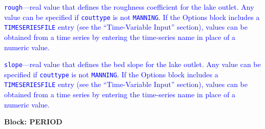 \begin{description}
\item \textcolor{blue}{\texttt{rough}---real value that defines the roughness coefficient for the lake outlet. Any value can be specified if \texttt{couttype} is not \texttt{MANNING}. If the Options block includes a \texttt{TIMESERIESFILE} entry (see the ``Time-Variable Input'' section), values can be obtained from a time series by entering the time-series name in place of a numeric value.}

\item \textcolor{blue}{\texttt{slope}---real value that defines the bed slope for the lake outlet. Any value can be specified if \texttt{couttype} is not \texttt{MANNING}. If the Options block includes a \texttt{TIMESERIESFILE} entry (see the ``Time-Variable Input'' section), values can be obtained from a time series by entering the time-series name in place of a numeric value.}

\end{description}
\item \textbf{Block: PERIOD}

